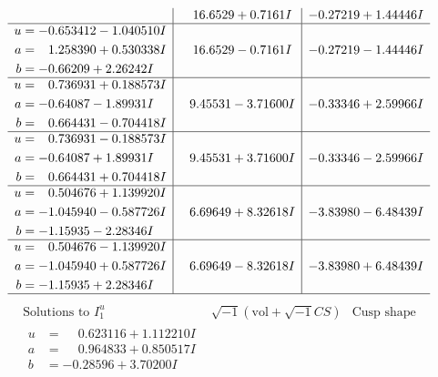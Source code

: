 \documentclass[1p]{elsarticle_modified}
\theoremstyle{definition}
\newcommand{\I}{\sqrt{-1}}
\begin{document}
$$\begin{array}{c|c|c}
 & \phantom{-}16.6529 + 0.7161 I & -0.27219 + 1.44446 I \\ \hline\begin{aligned}
u &= -0.653412 - 1.040510 I \\
a &= \phantom{-}1.258390 + 0.530338 I \\
b &= -0.66209 + 2.26242 I\end{aligned}
 & \phantom{-}16.6529 - 0.7161 I & -0.27219 - 1.44446 I \\ \hline\begin{aligned}
u &= \phantom{-}0.736931 + 0.188573 I \\
a &= -0.64087 - 1.89931 I \\
b &= \phantom{-}0.664431 - 0.704418 I\end{aligned}
 & \phantom{-}9.45531 - 3.71600 I & -0.33346 + 2.59966 I \\ \hline\begin{aligned}
u &= \phantom{-}0.736931 - 0.188573 I \\
a &= -0.64087 + 1.89931 I \\
b &= \phantom{-}0.664431 + 0.704418 I\end{aligned}
 & \phantom{-}9.45531 + 3.71600 I & -0.33346 - 2.59966 I \\ \hline\begin{aligned}
u &= \phantom{-}0.504676 + 1.139920 I \\
a &= -1.045940 - 0.587726 I \\
b &= -1.15935 - 2.28346 I\end{aligned}
 & \phantom{-}6.69649 + 8.32618 I & -3.83980 - 6.48439 I \\ \hline\begin{aligned}
u &= \phantom{-}0.504676 - 1.139920 I \\
a &= -1.045940 + 0.587726 I \\
b &= -1.15935 + 2.28346 I\end{aligned}
 & \phantom{-}6.69649 - 8.32618 I & -3.83980 + 6.48439 I\\
 \hline 
 \end{array}$$\newpage$$\begin{array}{c|c|c}  
\text{Solutions to }I^u_{1}& \I (\text{vol} + \sqrt{-1}CS) & \text{Cusp shape}\\
 \hline 
\begin{aligned}
u &= \phantom{-}0.623116 + 1.112210 I \\
a &= \phantom{-}0.964833 + 0.850517 I \\
b &= -0.28596 + 3.70200 I\end{aligned}

\end{array}$$
\end{document}
